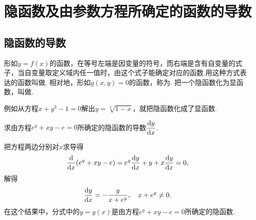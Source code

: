 \section{隐函数及由参数方程所确定的函数的导数}\label{section:导数与微分.隐函数及由参数方程所确定的函数的导数}
\subsection{隐函数的导数}
\begin{definition}
形如\(y=f(x)\)的函数，在等号左端是因变量的符号，而右端是含有自变量的式子，当自变量取定义域内任一值时，由这个式子能确定对应的函数.用这种方式表达的函数叫做.
相对地，形如\(g(x,y)=0\)的函数，称为.
把一个隐函数化为显函数，叫做.
\end{definition}

\begin{example}
例如从方程\(x+y^3-1=0\)解出\(y=\sqrt[3]{1-x}\)，就把隐函数化成了显函数.
\end{example}

\begin{example}
求由方程\(e^y + xy - e = 0\)所确定的隐函数的导数\(\displaystyle\dv{y}{x}\).
\begin{solution}
把方程两边分别对\(x\)求导得\begin{equation*}
	\dv{x}(e^y+xy-e) = e^y \dv{y}{x} + y + x \dv{y}{x} = 0,
\end{equation*}
解得\begin{equation*}
	\dv{y}{x} = -\frac{y}{x+e^y},
	\quad x+e^y \neq 0.
\end{equation*}
在这个结果中，分式中的\(y=y(x)\)是由方程\(e^y + xy - e = 0\)所确定的隐函数.
\end{solution}
\end{example}

